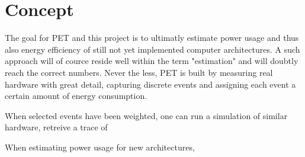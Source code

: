 \section{Concept}
The goal for PET and this project is to ultimatly estimate power usage and thus also
energy efficiency of still not yet implemented computer architectures. A such approach
will of cource reside well within the term "estimation" and will doubtly reach the correct
numbers. Never the less, PET is built by measuring real hardware with great detail, capturing
discrete events and assigning each event a certain amount of energy consumption.

When selected events have been weighted, one can run a simulation of similar hardware, retreive
a trace of 

When estimating power usage for new architectures, 
